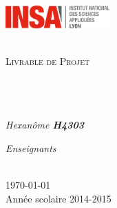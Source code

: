 \documentclass[11pt, oneside]{Report} %
\begin{document}
\begin{titlepage}
\begin{center}
	\begin{minipage}[t]{0.48\textwidth}
	  \begin{flushleft}
	    \includegraphics [width=40mm]{Logo} 
	  \end{flushleft}
	\end{minipage}
	\begin{minipage}[t]{0.48\textwidth}
	  \begin{flushright}
	  \end{flushright}
	\end{minipage} \\[2cm]
	
\textsc{\Large Livrable de Projet}\\[0.5cm] %

\HRule \\[0.4cm] %
{\huge \bfseries \ttitle}\\[0.4cm] %
\HRule \\[1.5cm] %
 
\begin{minipage}[t]{0.4\textwidth}
\begin{flushleft} \large
\emph{Hexanôme \textbf{H4303}}\\
{\authornames}
\end{flushleft}
\end{minipage}
\begin{minipage}[t]{0.48\textwidth}
\begin{flushright} \large
\emph{Enseignants} \\
{\supname}
\end{flushright}
\end{minipage}\\[3cm]
{\large \today}\\[4cm] %

\vfill
\footnotesize{Année scolaire 2014-2015}
\end{center}

\end{titlepage}



\end{document}
